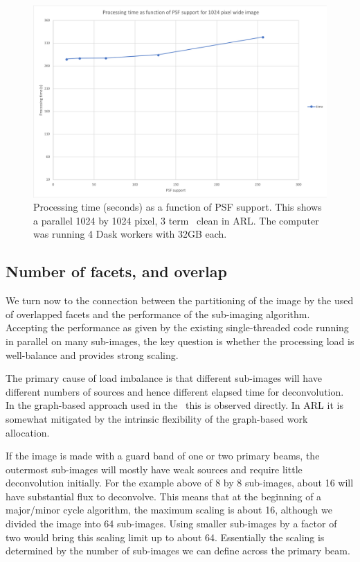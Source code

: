 \documentclass[11pt,a4paper,variablewidth]{article}
\begin{document}
\begin{figure}[H]
  \centering
  \includegraphics[width=\textwidth]{./pngs/time_versus_support}
  \caption{Processing time (seconds) as a function of PSF support. This shows  a parallel 1024 by 1024 pixel, 3 term \MAM\ clean in ARL. The computer was running 4 Dask workers with 32GB each.}
  \label{fig:time_vs_support}
\end{figure}

\subsection{Number of facets, and overlap}

We turn now to the connection between the partitioning of the image by the used of overlapped facets and the performance of the sub-imaging algorithm. Accepting the performance as given by the existing single-threaded code running in parallel on many sub-images, the key question is whether the processing load is well-balance and provides strong scaling.

The primary cause of load imbalance is that different sub-images will have different numbers of sources and hence different elapsed time for deconvolution. In the graph-based approach used in the \ARL\ this is observed directly. In ARL it is somewhat mitigated by the intrinsic flexibility of the graph-based work allocation. 

If the image is made with a guard band of one or two primary beams, the outermost sub-images will mostly have weak sources and require little deconvolution initially. For the example above of 8 by 8 sub-images, about 16 will have substantial flux to deconvolve. This means that at the beginning of a major/minor cycle algorithm, the maximum scaling is about 16, although we divided the image into 64 sub-images. Using smaller sub-images by a factor of two would bring this scaling limit up to about 64. Essentially the scaling is determined by the number of sub-images we can define across the primary beam.
\end{document}
